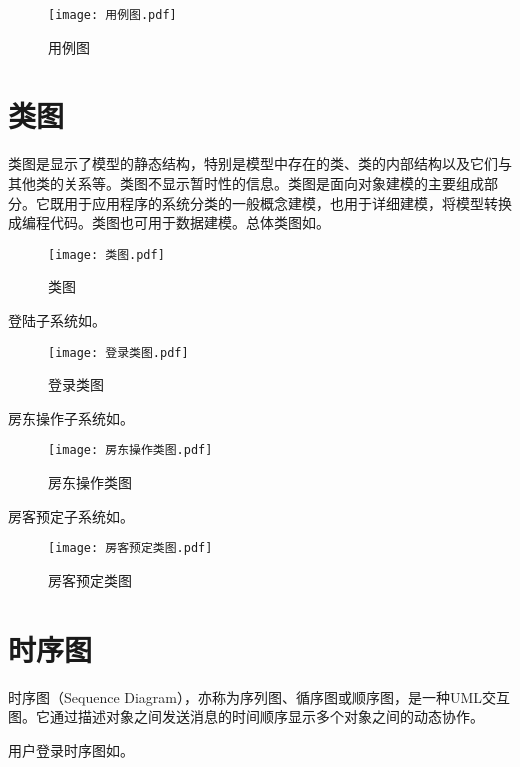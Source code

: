 \documentclass[lang=cn,11pt,a4paper,cite=authoryear]{elegantpaper}
\begin{document}
\begin{figure}[]
    \centering
    \texttt{[image: 用例图.pdf]}
    \caption{用例图}
    \label{fig:用例图}
\end{figure}

\section{类图}

类图是显示了模型的静态结构，特别是模型中存在的类、类的内部结构以及它们与其他类的关系等。类图不显示暂时性的信息。类图是面向对象建模的主要组成部分。它既用于应用程序的系统分类的一般概念建模，也用于详细建模，将模型转换成编程代码。类图也可用于数据建模。总体类图如。

\begin{figure}[]
    \centering
    \texttt{[image: 类图.pdf]}
    \caption{类图}
    \label{fig:类图}
\end{figure}


登陆子系统如。

\begin{figure}[]
    \centering
    \texttt{[image: 登录类图.pdf]}
    \caption{登录类图}
    \label{fig:登录类图}
\end{figure}


房东操作子系统如。

\begin{figure}[]
    \centering
    \texttt{[image: 房东操作类图.pdf]}
    \caption{房东操作类图}
    \label{fig:房东操作类图}
\end{figure}

房客预定子系统如。

\begin{figure}[]
    \centering
    \texttt{[image: 房客预定类图.pdf]}
    \caption{房客预定类图}
    \label{fig:房客预定类图}
\end{figure}



\section{时序图}

时序图（Sequence Diagram），亦称为序列图、循序图或顺序图，是一种UML交互图。它通过描述对象之间发送消息的时间顺序显示多个对象之间的动态协作。

用户登录时序图如。
\end{document}
